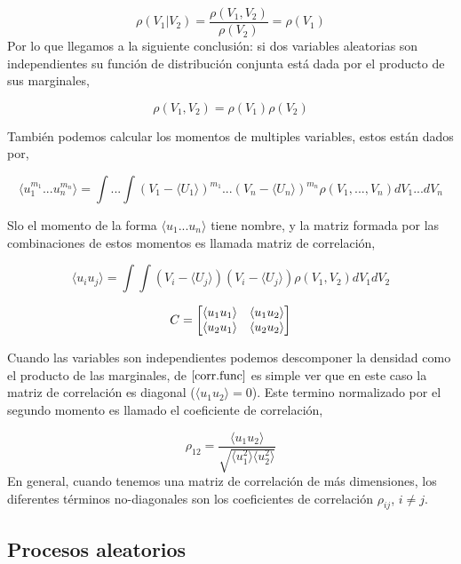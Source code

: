 \documentclass[executivepaper,12pt]{article}
\numberwithin{equation}{section}
\begin{document}
\begin{equation*}
	\rho(V_1\rvert V_2)=\frac{\rho(V_1,V_2)}{\rho(V_2)}=\rho(V_1)
\end{equation*}
Por lo que llegamos a la siguiente conclusión: si dos variables aleatorias son independientes su función de distribución conjunta está dada por el producto de sus marginales,

\begin{equation}
	\rho(V_1,V_2)=\rho(V_1)\rho(V_2)
\end{equation}

También podemos calcular los momentos de multiples variables, estos están dados por,

\begin{equation}
	\langle u_1^{m_1}... u_n^{m_n}\rangle = \int...\int (V_1-\langle U_1\rangle)^{m_1} ... (V_n -\langle U_n\rangle)^{m_n} \rho(V_1,...,V_n) dV_1...dV_n
\end{equation}

Slo el momento de la forma $\langle u_1...u_n\rangle$ tiene nombre, y la matriz formada por las combinaciones de estos momentos es llamada matriz de correlación,

\begin{equation}
	\langle u_i u_j \rangle = \int\int (V_i-\langle U_j\rangle) (V_i-\langle U_j\rangle) \rho(V_1,V_2) dV_1 dV_2
	\label{corr.func}
\end{equation}

\begin{equation*}
    C=\mqty[\langle u_1 u_1 \rangle & \langle u_1 u_2 \rangle \\ \langle u_2 u_1 \rangle & \langle u_2 u_2 \rangle]
\end{equation*}

Cuando las variables son independientes podemos descomponer la densidad como el producto de las marginales, de $\ref{corr.func}$ es simple ver que en este caso la matriz de correlación es diagonal ($\langle u_1 u_2\rangle=0$). Este termino normalizado por el segundo momento es llamado el coeficiente de correlación,

\begin{equation*}
	\rho_{12}=\frac{\langle u_1 u_2\rangle}{\sqrt{\langle u_1 ^2\rangle\langle u_2 ^2\rangle}}
\end{equation*}
En general, cuando tenemos una matriz de correlación de más dimensiones, los diferentes términos no-diagonales son los coeficientes de correlación $\rho_{ij}$, $i\neq j$. 

\subsection{Procesos aleatorios}
\end{document}
